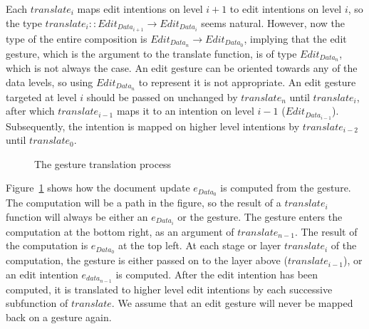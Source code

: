 Each $translate_i$ maps edit intentions on level $i+1$ to edit intentions on level $i$, so the type $translate_i :: Edit_{Data_{i+1}} \rightarrow Edit_{Data_i}$ seems natural. However, now the type of the entire composition is $Edit_{Data_n} \rightarrow Edit_{Data_0}$, implying that the edit gesture, which is the argument to the translate function, is of type $Edit_{Data_n}$, which is not always the case. An edit gesture can be oriented towards any of the data levels, so using $Edit_{Data_n}$ to represent it is not appropriate. An edit gesture targeted at level $i$ should be passed on unchanged by $translate_n$ until $translate_{i}$, after which $translate_{i-1}$ maps it to an intention on level $i-1$ ($Edit_{Data_{i-1}}$). Subsequently, the intention is mapped on higher level intentions by $translate_{i-2}$ until $translate_0$. 
\begin{figure}
\begin{small}
\begin{center}
\begin{center}
\begin{small}
\bigskip \noindent
{}
\end{small}
\end{center}\caption{The gesture translation process }\label{translate} 
\end{center}
\end{small}
\end{figure}


Figure~\ref{translate} shows how the document update $e_{Data_0}$ is computed from the gesture. The computation will be a path in the figure, so the result of a $translate_i$ function will always be either an $e_{Data_i}$ or the gesture. The gesture enters the computation at the bottom right, as an argument of $translate_{n-1}$. The result of the computation is $e_{Data_0}$ at the top left. At each stage or layer $translate_i$ of the computation, the gesture is either passed on to the layer above ($translate_{i-1}$), or an edit intention $e_{data_{n-1}}$ is computed. After the edit intention has been computed, it is translated to higher level edit intentions by each successive subfunction of $translate$. We assume that an edit gesture will never be mapped back on a gesture again.


